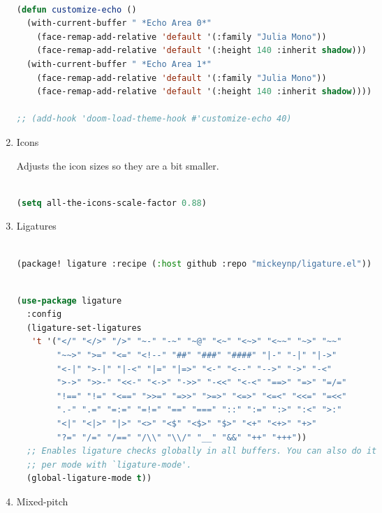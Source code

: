 \documentclass[11pt]{article}
\begin{document}
\begin{enumerate}
  \begin{lstlisting}[language=Lisp]%! Someone please complete this list for me

(defun customize-echo ()
  (with-current-buffer " *Echo Area 0*"
    (face-remap-add-relative 'default '(:family "Julia Mono"))
    (face-remap-add-relative 'default '(:height 140 :inherit shadow)))
  (with-current-buffer " *Echo Area 1*"
    (face-remap-add-relative 'default '(:family "Julia Mono"))
    (face-remap-add-relative 'default '(:height 140 :inherit shadow))))

;; (add-hook 'doom-load-theme-hook #'customize-echo 40)
\end{lstlisting}
  \item Icons
  \label{sec:icons}

  Adjusts the icon sizes so they are a bit smaller.

\begin{lstlisting}[language=Lisp]%! Someone please complete this list for me

(setq all-the-icons-scale-factor 0.88)
\end{lstlisting}
  \item Ligatures
  \label{sec:ligatures}

  \begin{lstlisting}[language=Lisp]%! Someone please complete this list for me

(package! ligature :recipe (:host github :repo "mickeynp/ligature.el"))
\end{lstlisting}

\begin{lstlisting}[language=Lisp]%! Someone please complete this list for me

(use-package ligature
  :config
  (ligature-set-ligatures
   't '("</" "</>" "/>" "~-" "-~" "~@" "<~" "<~>" "<~~" "~>" "~~"
        "~~>" ">=" "<=" "<!--" "##" "###" "####" "|-" "-|" "|->"
        "<-|" ">-|" "|-<" "|=" "|=>" "<-" "<--" "-->" "->" "-<"
        ">->" ">>-" "<<-" "<->" "->>" "-<<" "<-<" "==>" "=>" "=/="
        "!==" "!=" "<==" ">>=" "=>>" ">=>" "<=>" "<=<" "<<=" "=<<"
        ".-" ".=" "=:=" "=!=" "==" "===" "::" ":=" ":>" ":<" ">:"
        "<|" "<|>" "|>" "<>" "<$" "<$>" "$>" "<+" "<+>" "+>"
        "?=" "/=" "/==" "/\\" "\\/" "__" "&&" "++" "+++"))
  ;; Enables ligature checks globally in all buffers. You can also do it
  ;; per mode with `ligature-mode'.
  (global-ligature-mode t))
\end{lstlisting}
  \item Mixed-pitch
  \label{sec:mixed-pitch}


\end{enumerate}
\end{document}
